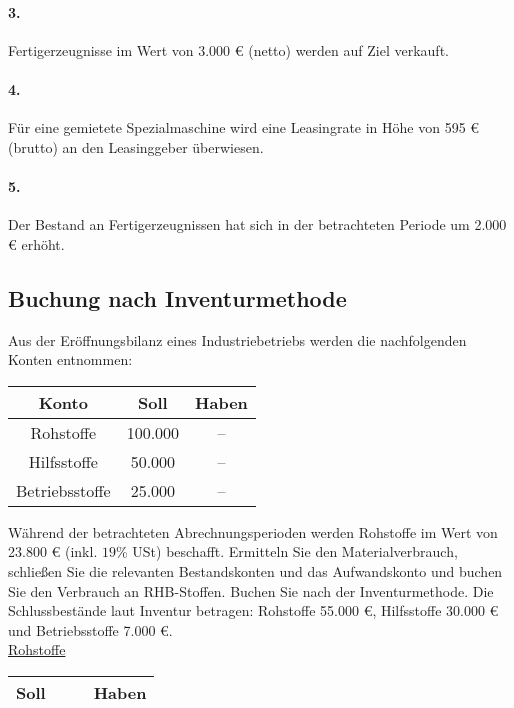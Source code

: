 \documentclass[paper=a4, fontsize=11pt]{scrartcl}
\numberwithin{equation}{section}
\numberwithin{figure}{section}
\numberwithin{table}{section}
\begin{document}
{\paragraph{3.}
Fertigerzeugnisse im Wert von 3.000 € (netto) werden auf Ziel verkauft. \\

\paragraph{4.}
Für eine gemietete Spezialmaschine wird eine Leasingrate in Höhe von 595 € (brutto) an den Leasinggeber überwiesen. \\

\paragraph{5.}
Der Bestand an Fertigerzeugnissen hat sich in der betrachteten Periode um 2.000 € erhöht. \\

\subsection{Buchung nach Inventurmethode}
Aus der Eröffnungsbilanz eines Industriebetriebs werden die nachfolgenden Konten entnommen: \\

\begin{tabular}{c|cc}
Konto & Soll & Haben \\
\hline
Rohstoffe & 100.000 & -- \\
\hline
Hilfsstoffe & 50.000 & -- \\
\hline
Betriebsstoffe & 25.000 & --\\
\end{tabular}

Während der betrachteten Abrechnungsperioden werden Rohstoffe im Wert von 23.800 € (inkl. $19 \%$ USt) beschafft. Ermitteln Sie den Materialverbrauch, schließen Sie die relevanten Bestandskonten und das Aufwandskonto und buchen Sie den Verbrauch an RHB-Stoffen. Buchen Sie nach der Inventurmethode. Die Schlussbestände laut Inventur betragen: Rohstoffe 55.000 €, Hilfsstoffe 30.000 € und Betriebsstoffe 7.000 €. \\

\underline{Rohstoffe}

\begin{tabular}{cc|cc}
\hline
Soll & & & Haben \\
\hline
\end{tabular}
\\

}
\end{document}
